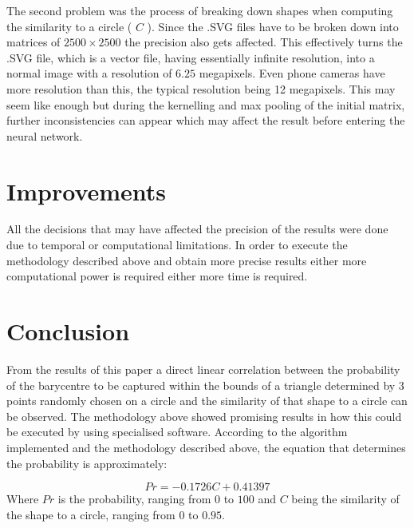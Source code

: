 \documentclass[9pt,onecolumn,oneside]{osajnl}
\begin{document}
    The second problem was the process of breaking down shapes when computing the similarity to a circle ( \(C\) ). Since the .SVG files have to be broken down into matrices of \(2500\times2500\) the precision also gets affected. This effectively turns the .SVG file, which is a vector file, having essentially infinite resolution, into a normal image with a resolution of \(6.25\) megapixels. Even phone cameras have more resolution than this, the typical resolution being 12 megapixels. This may seem like enough but during the kernelling and max pooling of the initial matrix, further inconsistencies can appear which may affect the result before entering the neural network.

\section{Improvements}

	All the decisions that may have affected the precision of the results were done due to temporal or computational limitations. In order to execute the methodology described above and obtain more precise results either more computational power is required either more time is required. 
    
 \section{Conclusion}

	From the results of this paper a direct linear correlation between the probability of the barycentre to be captured within the bounds of a triangle determined by 3 points randomly chosen on a circle and the similarity of that shape to a circle can be observed. The methodology above showed promising results in how this could be executed by using specialised software. According to the algorithm implemented and the methodology described above, the equation that determines the probability is approximately:
    
    \[Pr = -0.1726C + 0.41397\]
    Where \(Pr\) is the probability, ranging from \(0\) to \(100\) and \(C\) being the similarity of the shape to a circle, ranging from \(0\) to \(0.95\).
    
  \cite{Pelt254}\cite{Wang2003}\cite{Kim2017}\cite{10.1145/3082031.3083236}\cite{5352485}\cite{80269}\cite{anthony1999neural}\cite{FEINDT2006190}\cite{8308186}
    

\end{document}

